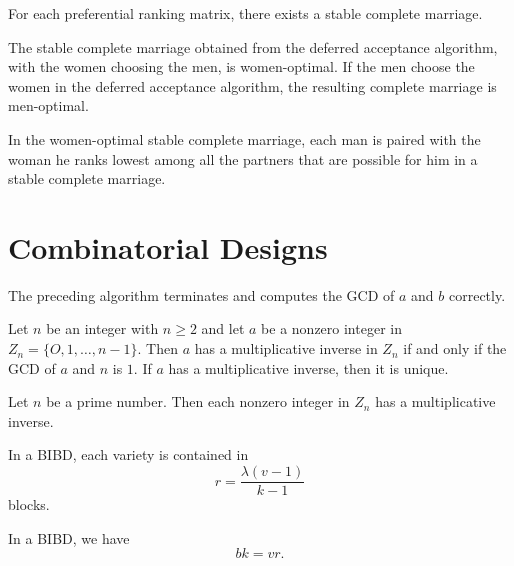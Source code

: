 \begin{theorem}
  \label{thm:9.3.1}
  For each preferential ranking matrix, there exists a stable complete marriage.
\end{theorem}

\begin{theorem}
  \label{thm:9.3.2}
  The stable complete marriage obtained from the deferred acceptance algorithm, with the women 
  choosing the men, is women-optimal. If the men choose the women in the deferred acceptance 
  algorithm, the resulting complete marriage is men-optimal.
\end{theorem}

\begin{corollary}
  \label{cor:9.3.3}
  In the women-optimal stable complete marriage, each man is paired with the woman he ranks lowest 
  among all the partners that are possible for him in a stable complete marriage.
\end{corollary}

\chapter{Combinatorial Designs}

\begin{theorem}
  \label{thm:10.1.1}
  The preceding algorithm terminates and computes the GCD of $a$ and $b$ correctly.
\end{theorem}

\begin{theorem}
  \label{thm:10.1.2}
  Let $n$ be an integer with $n \geq 2$ and let $a$ be a nonzero integer in $Z_n = \{O,1 ,\ldots, 
  n - 1\}$. Then $a$ has a multiplicative inverse in $Z_n$ if and only if the GCD of $a$ and $n$ is 
  $1$. If $a$ has a multiplicative inverse, then it is unique.
\end{theorem}

\begin{corollary}
  \label{cor:10.1.3}
  Let $n$ be a prime number. Then each nonzero integer in $Z_n$ has a multiplicative inverse.
\end{corollary}

\begin{theorem}
  \label{thm:10.2.1}
  In a BIBD, each variety is contained in
  \[ r = \frac{\lambda(v-1)}{k-1} \]
  blocks.
\end{theorem}

\begin{corollary}
  \label{cor:10.2.2}
  In a BIBD, we have
  \[ bk=vr. \]
\end{corollary}

